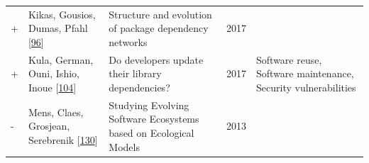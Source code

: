 \documentclass[]{book}
\begin{document}
\begin{longtable}[]{@{}lllll@{}}
\begin{minipage}[t]{0.01\columnwidth}
+\strut
\end{minipage} & \begin{minipage}[t]{0.09\columnwidth}\raggedright\strut
Kikas, Gousios, Dumas, Pfahl
{[}\protect\hyperlink{ref-Kikas2017}{96}{]}\strut
\end{minipage} & \begin{minipage}[t]{0.34\columnwidth}\raggedright\strut
Structure and evolution of package dependency networks\strut
\end{minipage} & \begin{minipage}[t]{0.02\columnwidth}\raggedright\strut
2017\strut
\end{minipage} & \begin{minipage}[t]{0.39\columnwidth}\raggedright\strut
\strut
\end{minipage}\tabularnewline
\begin{minipage}[t]{0.01\columnwidth}\raggedright\strut
+\strut
\end{minipage} & \begin{minipage}[t]{0.09\columnwidth}\raggedright\strut
Kula, German, Ouni, Ishio, Inoue
{[}\protect\hyperlink{ref-Kula2017}{104}{]}\strut
\end{minipage} & \begin{minipage}[t]{0.34\columnwidth}\raggedright\strut
Do developers update their library dependencies?\strut
\end{minipage} & \begin{minipage}[t]{0.02\columnwidth}\raggedright\strut
2017\strut
\end{minipage} & \begin{minipage}[t]{0.39\columnwidth}\raggedright\strut
Software reuse, Software maintenance, Security vulnerabilities\strut
\end{minipage}\tabularnewline
\begin{minipage}[t]{0.01\columnwidth}\raggedright\strut
-\strut
\end{minipage} & \begin{minipage}[t]{0.09\columnwidth}\raggedright\strut
Mens, Claes, Grosjean, Serebrenik
{[}\protect\hyperlink{ref-Mens2013}{130}{]}\strut
\end{minipage} & \begin{minipage}[t]{0.34\columnwidth}\raggedright\strut
Studying Evolving Software Ecosystems based on Ecological Models\strut
\end{minipage} & \begin{minipage}[t]{0.02\columnwidth}\raggedright\strut
2013\strut
\end{minipage} & \begin{minipage}[t]{0.39\columnwidth}\raggedright\strut

\end{minipage}
\end{longtable}
\end{document}
